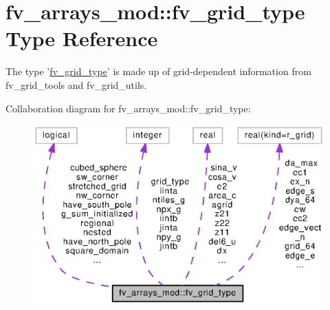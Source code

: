 \section{fv\-\_\-arrays\-\_\-mod\-:\-:fv\-\_\-grid\-\_\-type Type Reference}
\label{structfv__arrays__mod_1_1fv__grid__type}


The type '\hyperlink{structfv__arrays__mod_1_1fv__grid__type}{fv\-\_\-grid\-\_\-type}' is made up of grid-\/dependent information from fv\-\_\-grid\-\_\-tools and fv\-\_\-grid\-\_\-utils.  




Collaboration diagram for fv\-\_\-arrays\-\_\-mod\-:\-:fv\-\_\-grid\-\_\-type\-:
\nopagebreak
\begin{figure}[H]
\begin{center}
\leavevmode
\includegraphics[width=350pt]{structfv__arrays__mod_1_1fv__grid__type__coll__graph}
\end{center}
\end{figure}
